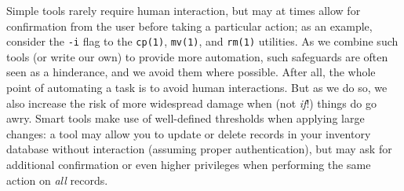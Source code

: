 Simple tools rarely require human interaction, but may
at times allow for confirmation from the user before
taking a particular action; as an example, consider
the {\tt -i} flag to the {\tt cp(1)}, {\tt mv(1)}, and
{\tt rm(1)} utilities.  As we combine such tools (or
write our own) to provide more automation, such
safeguards are often seen as a hinderance, and we
avoid them where possible.  After all, the whole point
of automating a task is to avoid human interactions.
But as we do so, we also increase the risk of more
widespread damage when (not {\em if}!) things do go awry.
Smart tools make use of well-defined thresholds when
applying large changes: a tool may allow you to update
or delete records in your inventory database without
interaction (assuming proper authentication), but may
ask for additional confirmation or even higher
privileges when performing the same action on {\em
all} records.

